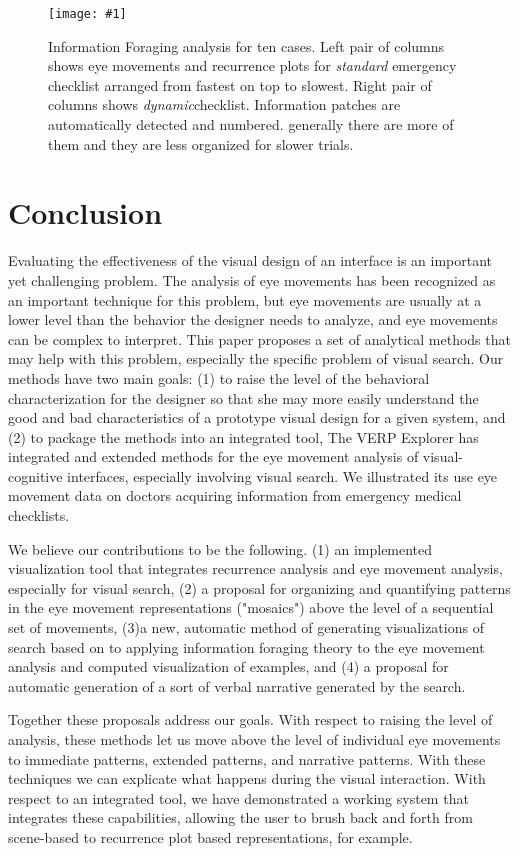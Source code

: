\documentclass[journal]{vgtc}                %
\newcommand{\insertpicture}[2]{\begin{center}\texttt{[image: \#1]}\end{center}}
\begin{document}
\begin{figure}
	\insertpicture{figures/table.pdf}{0.4}
	\caption{Information Foraging analysis for ten cases. 
Left pair of columns shows eye movements and recurrence plots for 
\emph{standard} emergency checklist arranged from fastest on top to slowest. 
Right pair of columns shows \emph{dynamic}checklist. Information patches are automatically detected and numbered. generally there are more of them and they are less organized for slower trials. \label{fig:cases}}
\end{figure}

\section{Conclusion} 
Evaluating the effectiveness of the visual design of an
interface is an important yet challenging problem. The analysis of eye movements has been recognized as an important technique for this problem, but eye movements are usually at a lower level than the behavior the designer needs to analyze, and eye movements can be complex to interpret.
This paper proposes a set
of analytical methods that may help with this problem, especially the
specific problem of visual search. Our methods have two main goals: (1) to
raise the level of the behavioral characterization for the designer so that
she may more easily understand the good and bad characteristics of a
prototype visual design for a given system, and (2) to package the methods
into an integrated tool, The VERP Explorer has integrated and extended methods for the eye movement analysis of visual-cognitive interfaces, especially involving visual search. We illustrated its use eye movement data on doctors acquiring information from emergency medical checklists.

We believe our contributions to be the following. (1) an implemented visualization tool that integrates recurrence analysis and eye movement analysis, especially for visual search, (2) a proposal for organizing and quantifying patterns in the eye movement representations  ("mosaics") above the level of a sequential set of movements, (3)a new, automatic method of generating visualizations of search based on to applying information foraging theory to the eye movement analysis and computed visualization of examples, and (4) a proposal for automatic generation of a sort of verbal narrative generated by the search.

Together these proposals address our goals. With respect to raising the level of analysis, these methods let us move above the level of individual eye movements to immediate patterns, extended patterns, and narrative patterns. With these techniques we can explicate what happens during the visual interaction. With respect to an integrated tool, we have demonstrated a working system that integrates these capabilities, allowing the user to brush back and forth from scene-based to recurrence plot based representations, for example.
\end{document}
